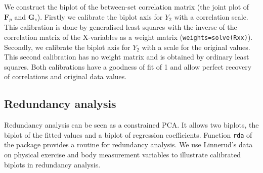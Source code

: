 \documentclass[a4paper]{article}
\newcommand{\bF}{\ensuremath{\mathbf F}}
\newcommand{\bG}{\ensuremath{\mathbf G}}
\begin{document}
We construct the biplot of the between-set correlation matrix (the joint 
plot of ${\bF}_p$ and ${\bG}_s$). 
Firstly we calibrate the biplot axis for $Y_2$ with a correlation scale.
This calibration is done by generalised least squares with the inverse of the correlation matrix of 
the X-variables as a weight matrix ({\tt weights=solve(Rxx)}). Secondly, we calibrate the biplot axis 
for $Y_2$ with a scale for the original values. This second calibration has no weight 
matrix and is obtained by ordinary least squares. Both calibrations have a goodness of fit of 1 and
allow perfect recovery of correlations and original data values.

\subsection{Redundancy analysis}
\label{sec:rda}

Redundancy analysis can be seen as a constrained PCA. It allows two biplots, the biplot of the fitted
values and a biplot of regression coefficients. Function {\tt rda} of the package provides a routine
for redundancy analysis. We use Linnerud's data on physical exercise and body measurement variables
to illustrate calibrated biplots in redundancy analysis.
\end{document}
